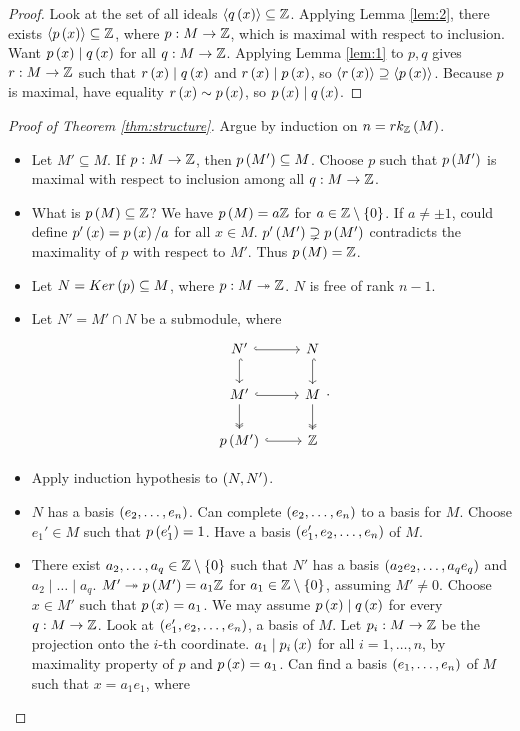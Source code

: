 \begin{proof}
Look at the set of all ideals $ \left\langle q\left( x \right) \right\rangle \subseteq \mathbb{Z} $. Applying Lemma \ref{lem:2}, there exists $ \left\langle p\left( x \right) \right\rangle \subseteq \mathbb{Z} $, where $ p : M \to \mathbb{Z} $, which is maximal with respect to inclusion. Want $ p\left( x \right) \mid q\left( x \right) $ for all $ q : M \to \mathbb{Z} $. Applying Lemma \ref{lem:1} to $ p, q $ gives $ r : M \to \mathbb{Z} $ such that $ r\left( x \right) \mid q\left( x \right) $ and $ r\left( x \right) \mid p\left( x \right) $, so $ \left\langle r\left( x \right) \right\rangle \supseteq \left\langle p\left( x \right) \right\rangle $. Because $ p $ is maximal, have equality $ r\left( x \right) \sim p\left( x \right) $, so $ p\left( x \right) \mid q\left( x \right) $.
\end{proof}

\begin{proof}[Proof of Theorem \ref{thm:structure}]
Argue by induction on $ n = rk_{\mathbb{Z}}\left( M \right) $.
\begin{itemize}
\item Let $ M' \subseteq M $. If $ p : M \to \mathbb{Z} $, then $ p\left( M' \right) \subseteq M $. Choose $ p $ such that $ p\left( M' \right) $ is maximal with respect to inclusion among all $ q : M \to \mathbb{Z} $.
\item What is $ p\left( M \right) \subseteq \mathbb{Z} $? We have $ p\left( M \right) = a\mathbb{Z} $ for $ a \in \mathbb{Z} \setminus \left\{ 0 \right\} $. If $ a \ne \pm 1 $, could define $ p'\left( x \right) = p\left( x \right) / a $ for all $ x \in M $. $ p'\left( M' \right) \supsetneq p\left( M' \right) $ contradicts the maximality of $ p $ with respect to $ M' $. Thus $ p\left( M \right) = \mathbb{Z} $.
\item Let $ N = Ker\left( p \right) \subseteq M $, where $ p : M \twoheadrightarrow \mathbb{Z} $. $ N $ is free of rank $ n - 1 $.
\item Let $ N' = M' \cap N $ be a submodule, where
$$
\begin{tikzcd}
N' \arrow[hookrightarrow]{r} \arrow[hookrightarrow]{d} & N \arrow[hookrightarrow]{d} \\
M' \arrow[hookrightarrow]{r} \arrow[twoheadrightarrow]{d} & M \arrow[twoheadrightarrow]{d} \\
p\rb{M'} \arrow[hookrightarrow]{r} & \Z
\end{tikzcd}.
$$
\item Apply induction hypothesis to $ \left( N, N' \right) $.
\item $ N $ has a basis $ \left( e_2, \dots, e_n \right) $. Can complete $ \left( e_2, \dots, e_n \right) $ to a basis for $ M $. Choose $ e_1' \in M $ such that $ p\left( e_1' \right) = 1 $. Have a basis $ \left( e_1', e_2, \dots, e_n \right) $ of $ M $.
\item There exist $ a_2, \dots, a_q \in \mathbb{Z} \setminus \left\{ 0 \right\} $ such that $ N' $ has a basis $ \left( a_2e_2, \dots, a_qe_q \right) $ and $ a_2 \mid \dots \mid a_q $. $ M' \twoheadrightarrow p\left( M' \right) = a_1\mathbb{Z} $ for $ a_1 \in \mathbb{Z} \setminus \left\{ 0 \right\} $, assuming $ M' \ne 0 $. Choose $ x \in M' $ such that $ p\left( x \right) = a_1 $. We may assume $ p\left( x \right) \mid q\left( x \right) $ for every $ q : M \to \mathbb{Z} $. Look at $ \left( e_1', e_2, \dots, e_n \right) $, a basis of $ M $. Let $ p_i : M \to \mathbb{Z} $ be the projection onto the $ i $-th coordinate. $ a_1 \mid p_i\left( x \right) $ for all $ i = 1, \dots, n $, by maximality property of $ p $ and $ p\left( x \right) = a_1 $. Can find a basis $ \left( e_1, \dots, e_n \right) $ of $ M $ such that $ x = a_1e_1 $, where

\end{itemize}
\end{proof}
